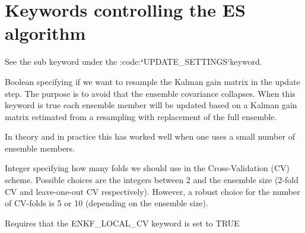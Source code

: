 \documentclass[letterpaper,10pt,english]{sphinxmanual}
\begin{document}
\section{Keywords controlling the ES algorithm}
\label{\detokenize{keywords/index:keywords-controlling-the-es-algorithm}}\label{\detokenize{keywords/index:id7}}\label{\detokenize{keywords/index:enkf-alpha}}
See the sub keyword  under the :code:{\color{red}\bfseries{}{}`}UPDATE\_SETTINGS{}`keyword.

\label{\detokenize{keywords/index:enkf-bootstrap}}
\begin{sphinxShadowBox}

Boolean specifying if we want to resample the Kalman gain matrix in the update
step. The purpose is to avoid that the ensemble covariance collapses. When
this keyword is true each ensemble member will be updated based on a Kalman
gain matrix estimated from a resampling with replacement of the full ensemble.

In theory and in practice this has worked well when one uses a small number of
ensemble members.
\end{sphinxShadowBox}
\label{\detokenize{keywords/index:enkf-cv-folds}}
\begin{sphinxShadowBox}

Integer specifying how many folds we should use in the Cross-Validation (CV)
scheme. Possible choices are the integers between 2 and the ensemble size
(2-fold CV and leave-one-out CV respectively). However, a robust choice for
the number of CV-folds is 5 or 10 (depending on the ensemble size).


%
\begin{sphinxVerbatim}[commandchars=\\\{\}]
         
 
\end{sphinxVerbatim}

Requires that the ENKF\_LOCAL\_CV keyword is set to TRUE
\end{sphinxShadowBox}
\label{\detokenize{keywords/index:enkf-force-ncomp}}
\end{document}
